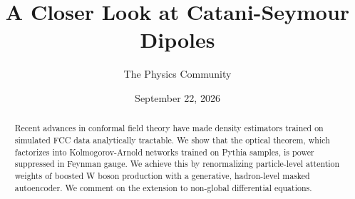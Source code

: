 \documentclass[11pt]{article}
\title{A Closer Look at Catani-Seymour Dipoles}
\author{The Physics Community}
\date{September 22, 2026}
\begin{document}
\maketitle
\begin{abstract}
Recent advances in conformal field theory have made density estimators
trained on simulated FCC data analytically tractable. We show that the
optical theorem, which factorizes into Kolmogorov-Arnold networks
trained on Pythia samples, is power suppressed in Feynman gauge. We
achieve this by renormalizing particle-level attention weights of
boosted W boson production with a generative, hadron-level masked
autoencoder. We comment on the extension to non-global differential
equations.
\end{abstract}
\tableofcontents





\nocite{*}


\end{document}

